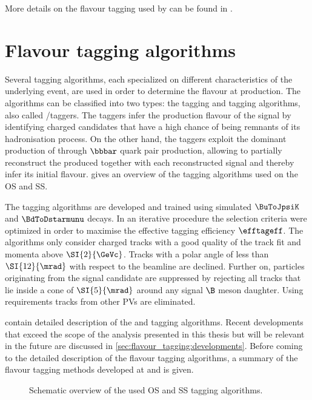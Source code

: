 More details on the flavour tagging used by \LHCb can be found in
\cite{Aaij:2012mu,FT:ANARunI,FT:RunI}. 

\section{Flavour tagging algorithms}
\label{sec:flavour_tagging:lhcb}

Several tagging algorithms, each specialized on different characteristics of the
underlying event, are used in order to determine the \Bmeson flavour at
production. The algorithms can be classified into two types: the \SS tagging and
\OS tagging algorithms, also called \SS/\OS taggers. The \SS taggers infer the
production flavour of the signal \Bmeson by identifying charged candidates
that have a high chance of being remnants of its hadronisation process. On the
other hand, the \OS taggers exploit the dominant production of \Bmesons
through $\bbbar$ quark pair production, allowing to partially reconstruct the
\bhadron produced together with each reconstructed signal \Bmeson and
thereby infer its initial flavour. 
gives an overview of the tagging algorithms used on the \acl{OS} and \acl{SS}.

The tagging algorithms are developed and trained using simulated $\BuToJpsiK$
and $\BdToDstarmunu$ decays. In an iterative procedure the selection criteria
were optimized in order to maximise the effective tagging efficiency
$\efftageff$. The algorithms only consider charged tracks with a good quality
of the track fit and momenta above $\SI{2}{\GeVc}$. Tracks with a polar angle of
less than $\SI{12}{\mrad}$ with respect to the beamline are declined. Further
on, particles originating from the signal candidate are suppressed by rejecting
all tracks that lie inside a cone of $\SI{5}{\mrad}$ around any signal $\B$
meson daughter. Using \IP requirements tracks from other \acp{PV} are
eliminated.

 contain detailed
description of the \OS and \SS tagging algorithms. Recent developments that
exceed the scope of the analysis presented in this thesis but will be relevant
in the future are discussed in \cref{sec:flavour_tagging:developments}. Before
coming to the detailed description of the \LHCb flavour tagging algorithms, a
summary of the flavour tagging methods developed at \Babar and \Belle is given.
%
\begin{figure}
\centering

\caption{Schematic overview of the used \acs*{OS} and \acs*{SS} tagging
algorithms. \cite{wishahi:2013jt}}
\label{fig:flavour_tagging:lhcb:schematics}
\end{figure}

